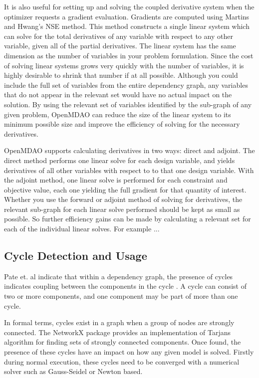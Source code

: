 \documentclass[]{aiaa-tc} %
\begin{document}
    It is also useful for setting up and solving the coupled derivative system when the optimizer requests
    a gradient evaluation. Gradients are computed using Martins and Hwang's NSE method\cite{Martins2012}. This
    method constructs a single linear system which can solve for the total derivatives of any variable with
    respect to any other variable, given all of the partial derivatives. The linear system has the same dimension
    as the number of variables in your problem formulation. Since the cost of solving linear systems grows very
    quickly with the number of variables, it is highly desirable to shrink that number if at all possible.
    Although you could include the full set of variables from the entire dependency graph, any variables that do
    not appear in the relevant set would have no actual impact on the solution. By using the relevant set
    of variables identified by the sub-graph of any given problem, OpenMDAO can
    reduce the size of the linear system to its minimum possible size and improve the efficiency
    of solving for the necessary derivatives.

    OpenMDAO supports calculating derivatives in two ways: direct and adjoint. The direct method performs
    one linear solve for each design variable, and yields derivatives of all other variables with respect to
    to that one design variable. With the adjoint method, one linear solve is performed for each constraint and
    objective value, each one yielding the full gradient for that quantity of interest. Whether you use the forward
    or adjoint method of solving for derivatives, the relevant sub-graph for each linear solve performed should be
    kept as small as possible. So further efficiency gains can be made by calculating a relevant set for each
    of the individual linear solves. For example ...


    \subsection{Cycle Detection and Usage}
    Pate et. al indicate that within a dependency graph, the presence of cycles indicates coupling between
    the components in the cycle \cite{graph_problem2013}. A cycle can consist of two or more components, and
    one component may be part of more than one cycle.

    In formal terms, cycles exist in a graph when a group of nodes are strongly connected. The NetworkX package
    provides an implementation of Tarjans algorithm for finding sets of strongly connected
    components\cite{tarjan1972depth,nuutila1994finding}. Once found, the presence of these cycles
    have an impact on how any given model is solved. Firstly during normal execution, these cycles
    need to be converged with a numerical solver such as Gauss-Seidel or Newton based.
\end{document}
